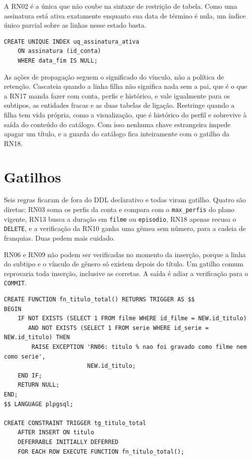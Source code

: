 \documentclass[a4paper,12pt,oneside,openany]{book}
\newcommand{\bd}[1]{\texttt{#1}}
\begin{document}
A RN02 é a única que não coube na sintaxe de restrição de tabela. Como uma
assinatura está ativa exatamente enquanto sua data de término é nula, um índice
único parcial sobre as linhas nesse estado basta.

\begin{lstlisting}[caption={Regras que se resolvem por índice.},label={lst:indices},basicstyle=\ttfamily\scriptsize]
CREATE UNIQUE INDEX uq_assinatura_ativa
    ON assinatura (id_conta)
    WHERE data_fim IS NULL;
\end{lstlisting}

As ações de propagação seguem o significado do vínculo, não a política de
retenção. Cascateia quando a linha filha não significa nada sem a pai, que é o
que a RN17 manda fazer com conta, perfis e histórico, e vale igualmente para os
subtipos, as entidades fracas e as duas tabelas de ligação. Restringe quando a
filha tem vida própria, como a visualização, que é histórico do perfil e
sobrevive à saída do conteúdo do catálogo. Com isso nenhuma chave estrangeira
impede apagar um título, e a guarda do catálogo fica inteiramente com o gatilho
da RN18.

\section{Gatilhos}\label{sec:gatilhos}

Seis regras ficaram de fora do DDL declarativo e todas viram gatilho. Quatro
são diretas: RN03 soma os perfis da conta e compara com o \bd{max\_perfis} do
plano vigente, RN13 busca a duração em \bd{filme} ou \bd{episodio}, RN18
apenas recusa o \bd{DELETE}, e a verificação da RN10 ganha uma gêmea sem
número, para a cadeia de franquias. Duas pedem mais cuidado.

RN06 e RN09 não podem ser verificadas no momento da inserção, porque a linha
do subtipo e o vínculo de gênero só existem depois do título. Um gatilho comum
reprovaria toda inserção, inclusive as corretas. A saída é adiar a verificação
para o \bd{COMMIT}.

\begin{lstlisting}[caption={Verificação adiada da totalidade da especialização (RN06).},label={lst:gatilho-adiado},basicstyle=\ttfamily\scriptsize]
CREATE FUNCTION fn_titulo_total() RETURNS TRIGGER AS $$
BEGIN
    IF NOT EXISTS (SELECT 1 FROM filme WHERE id_filme = NEW.id_titulo)
       AND NOT EXISTS (SELECT 1 FROM serie WHERE id_serie = NEW.id_titulo) THEN
        RAISE EXCEPTION 'RN06: titulo % nao foi gravado como filme nem como serie',
                        NEW.id_titulo;
    END IF;
    RETURN NULL;
END;
$$ LANGUAGE plpgsql;

CREATE CONSTRAINT TRIGGER tg_titulo_total
    AFTER INSERT ON titulo
    DEFERRABLE INITIALLY DEFERRED
    FOR EACH ROW EXECUTE FUNCTION fn_titulo_total();
\end{lstlisting}
\end{document}
